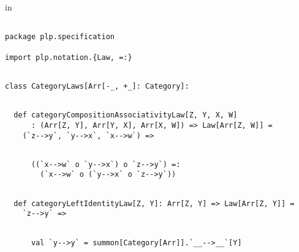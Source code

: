 \documentclass[11pt]{article}
\begin{document}
\clearpage

in

\vspace{6pt}
\begin{mdframed}[backgroundcolor=lightgray!20] 
\begin{lstlisting}

package plp.specification

import plp.notation.{Law, =:}
\end{lstlisting}
\end{mdframed}
\vspace{6pt}
\begin{mdframed}[backgroundcolor=lightgray!20] 
\begin{lstlisting}

class CategoryLaws[Arr[-_, +_]: Category]:
\end{lstlisting}
\end{mdframed}
\vspace{6pt}
\begin{mdframed}[backgroundcolor=lightgray!20] 
\begin{lstlisting}

  def categoryCompositionAssociativityLaw[Z, Y, X, W]
      : (Arr[Z, Y], Arr[Y, X], Arr[X, W]) => Law[Arr[Z, W]] =
    (`z-->y`, `y-->x`, `x-->w`) =>
\end{lstlisting}
\end{mdframed}
\vspace{6pt}
\begin{mdframed}[backgroundcolor=lightgray!20] 
\begin{lstlisting} 

      ((`x-->w` o `y-->x`) o `z-->y`) =:
        (`x-->w` o (`y-->x` o `z-->y`))
\end{lstlisting}
\end{mdframed}
\vspace{6pt}
\begin{mdframed}[backgroundcolor=lightgray!20] 
\begin{lstlisting}

  def categoryLeftIdentityLaw[Z, Y]: Arr[Z, Y] => Law[Arr[Z, Y]] =
    `z-->y` =>
\end{lstlisting}
\end{mdframed}
\vspace{6pt}
\begin{mdframed}[backgroundcolor=lightgray!20] 
\begin{lstlisting}

      val `y-->y` = summon[Category[Arr]].`__-->__`[Y]
\end{lstlisting}
\end{mdframed}
\end{document}

